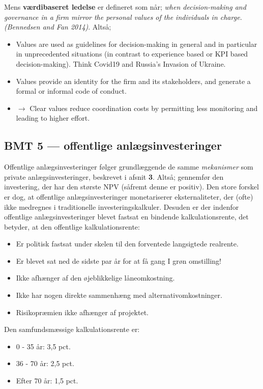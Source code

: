 \documentclass[10pt,reqno, usenames]{article}
\begin{document}
Mens \textbf{værdibaseret ledelse} er defineret som når; \textit{when decision-making and governance in a firm mirror the personal values of the individuals in charge. (Bennedsen and Fan 2014)}. Altså; 

\begin{itemize}
    \item Values are used as guidelines for decision-making in general and in particular in unprecedented situations (in contrast to experience based or KPI based decision-making). Think Covid19 and Russia's Invasion of Ukraine.
    \item Values provide an identity for the firm and its stakeholders, and generate a formal or informal code of conduct.
    \item $\rightarrow$ Clear values reduce coordination costs by permitting less monitoring and leading to higher effort.
\end{itemize}


\subsection{BMT 5 — offentlige anlægsinvesteringer}
Offentlige anlægsinvesteringer følger grundlæggende de samme \textit{mekanismer} som private anlægsinvesteringer, beskrevet i afsnit \textbf{3}. Altså; gennemfør den investering, der har den største NPV (såfremt denne er positiv). Den store forskel er dog, at offentlige anlægsinvesteringer monetariserer eksternaliteter, der (ofte) ikke medregnes i traditionelle investeringskalkuler. Desuden er der indenfor offentlige anlægsinvesteringer blevet fastsat en bindende kalkulationsrente, det betyder, at den offentlige kalkulationsrente: 

\begin{itemize}
    \item Er politisk fastsat under skelen til den forventede langsigtede realrente. 
    \item Er blevet sat ned de sidste par år for at få gang I grøn omstilling!
    \item Ikke afhænger af den øjeblikkelige låneomkostning.
    \item Ikke har nogen direkte sammenhæng med alternativomkostninger. 
    \item Risikopræmien ikke afhænger af projektet. 
\end{itemize}

Den samfundsmæssige kalkulationsrente er: 

\begin{itemize}
    \item 0 - 35 år: 3,5 pct. 
    \item 36 - 70 år: 2,5 pct. 
    \item Efter 70 år: 1,5 pct. 
\end{itemize}
\end{document}
